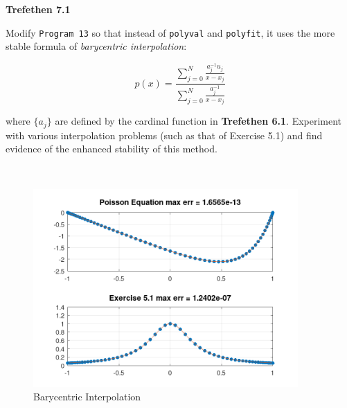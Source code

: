 \textbf{Trefethen 7.1}

Modify \texttt{Program 13} so that instead of \texttt{polyval} and \texttt{polyfit}, it uses the more stable formula of 
\textit{barycentric interpolation}:

$$
  p(x) = \frac{ \sum_{j=0}^N \frac{a_j^{-1} u_j}{x - x_j} }{ \sum_{j=0}^N \frac{a_j^{-1}}{x - x_j} }
$$

where $\{a_j\}$ are defined by the cardinal function in \textbf{Trefethen 6.1}. Experiment with various interpolation
problems (such as that of Exercise 5.1) and find evidence of the enhanced stability of this method.

\begin{solution}
  \ \\
  \begin{figure}[h]
    \centering
    \includegraphics*[width=0.9\textwidth]{problem_4.png}
    \caption{Barycentric Interpolation}
    \label{fig:poisson_spectral_barycentric_interpolation}
  \end{figure}
  \vfill
\end{solution}